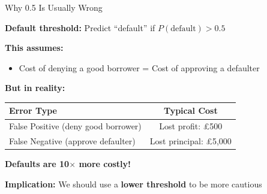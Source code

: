\documentclass[10pt]{beamer}
\newcommand{\highlight}[1]{\textcolor{AccentOrange}{\textbf{#1}}}
\begin{document}
\begin{frame}{Why 0.5 Is Usually Wrong}

  \textbf{Default threshold:} Predict ``default'' if $P(\text{default}) > 0.5$

  \vspace{1em}
  \textbf{This assumes:}
  \begin{itemize}
    \item Cost of denying a good borrower = Cost of approving a defaulter
  \end{itemize}

  \vspace{1em}
  \textbf{But in reality:}

  \vspace{0.3em}
  \begin{center}
  \begin{tabular}{lc}
    \toprule
    \textbf{Error Type} & \textbf{Typical Cost} \\
    \midrule
    False Positive (deny good borrower) & Lost profit: \pounds 500 \\
    False Negative (approve defaulter) & Lost principal: \pounds 5,000 \\
    \bottomrule
  \end{tabular}
  \end{center}

  \vspace{1em}
  \textbf{Defaults are 10$\times$ more costly!}

  \vspace{0.3em}
  \textbf{Implication:} We should use a \highlight{lower threshold} to be more cautious
\end{frame}

\end{document}
